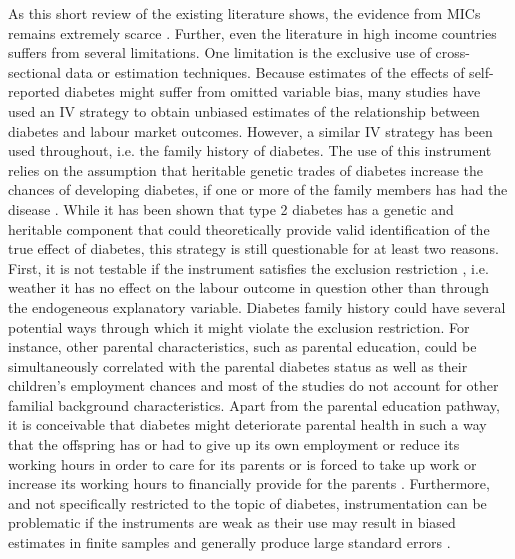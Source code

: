 \documentclass[12pt,english,british]{article}
\begin{document}
As this short review of the existing literature shows, the evidence from \ac{MICs} remains  extremely scarce \citep{Seuring2015a}. Further, even  the literature  in high income countries suffers from several limitations. One limitation is the exclusive use of cross-sectional data or estimation techniques. Because estimates of the effects of self-reported diabetes might
suffer from omitted variable bias, many studies have used an \ac{IV}
strategy to obtain unbiased estimates of the relationship between
diabetes and labour market outcomes. However, a similar \ac{IV} strategy has been used throughout, i.e. the family history
of diabetes. The use of this instrument relies on the assumption that heritable genetic trades of diabetes increase the chances of developing diabetes, if one or more of the family members
has had the disease \citep{Brown2005,Latif2009,Minor2010,Lin2011b,Seuring2015}. While it has been shown that type 2 diabetes has a genetic and heritable component that could theoretically provide valid identification of the true effect of diabetes, this strategy is still questionable for at least two reasons. First,
it is not testable if the instrument satisfies the exclusion restriction
 , i.e. weather it has no effect on the labour outcome in question other than through
the endogeneous explanatory variable. Diabetes family history could have several potential ways through which it might violate the exclusion restriction. For instance, other parental characteristics, such as parental education, could be simultaneously correlated with the parental diabetes status as well as their children{'}s
employment chances and most of the studies do not account for other familial background characteristics. Apart from the parental education pathway, it is conceivable that diabetes might deteriorate parental health in such a way that the offspring has or had to give
up its own employment or reduce its working hours in order to care for its parents or is forced to take up work or increase its working hours to financially provide for the parents \citep{Seuring2015}. Furthermore, and not specifically restricted to the topic of diabetes, instrumentation can be problematic if the instruments are weak as their use may result in biased estimates in finite samples and generally produce large standard errors \citep{Bound1995}. 
\end{document}
